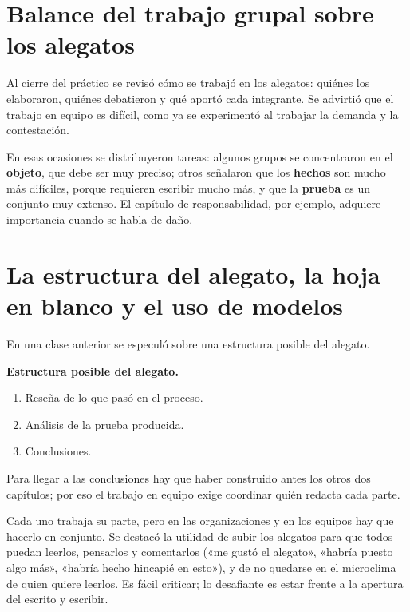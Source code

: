 \documentclass[12pt,oneside]{book}
\begin{document}
\section{Balance del trabajo grupal sobre los alegatos}

Al cierre del práctico se revisó cómo se trabajó en los alegatos: quiénes los elaboraron, quiénes debatieron y qué aportó cada integrante. Se advirtió que el trabajo en equipo es difícil, como ya se experimentó al trabajar la demanda y la contestación.

En esas ocasiones se distribuyeron tareas: algunos grupos se concentraron en el \textbf{objeto}, que debe ser muy preciso; otros señalaron que los \textbf{hechos} son mucho más difíciles, porque requieren escribir mucho más, y que la \textbf{prueba} es un conjunto muy extenso. El capítulo de responsabilidad, por ejemplo, adquiere importancia cuando se habla de daño.

\section{La estructura del alegato, la hoja en blanco y el uso de modelos}

En una clase anterior se especuló sobre una estructura posible del alegato.

\begin{important}
\textbf{Estructura posible del alegato.}
\begin{enumerate}
    \item Reseña de lo que pasó en el proceso.
    \item Análisis de la prueba producida.
    \item Conclusiones.
\end{enumerate}
Para llegar a las conclusiones hay que haber construido antes los otros dos capítulos; por eso el trabajo en equipo exige coordinar quién redacta cada parte.
\end{important}

Cada uno trabaja su parte, pero en las organizaciones y en los equipos hay que hacerlo en conjunto. Se destacó la utilidad de subir los alegatos para que todos puedan leerlos, pensarlos y comentarlos («me gustó el alegato», «habría puesto algo más», «habría hecho hincapié en esto»), y de no quedarse en el microclima de quien quiere leerlos. Es fácil criticar; lo desafiante es estar frente a la apertura del escrito y escribir.
\end{document}
